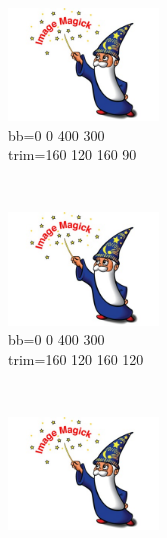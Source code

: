 \documentclass[french]{article}
\begin{document}
\begin{figure}[h]
\begin{subfigure}[b]{0.3\textwidth}
        \label{essai_6}
    \end{subfigure}
    \\
    \begin{subfigure}[b]{0.3\textwidth}
        \includegraphics[bb=0 0 400 300,trim=160 120 160 90,width=4cm,height=3cm,clip=true]{test.jpg}
        \caption{bb=0 0 400 300\\trim=160 120 160 90}%
        \label{essai_7}
    \end{subfigure}
    ~
    \begin{subfigure}[b]{0.3\textwidth}
        \includegraphics[bb=0 0 400 300,trim=160 120 160 120,width=4cm,height=3cm,clip=true]{test.jpg}
        \caption{bb=0 0 400 300\\trim=160 120 160 120}
        \label{essai_8}
    \end{subfigure}
    ~
    \begin{subfigure}[b]{0.3\textwidth}
        \includegraphics[bb=0 0 400 300,trim=160 120 160 150,width=4cm,height=3cm,clip=true]{test.jpg}

\end{subfigure}
\end{figure}
\end{document}
